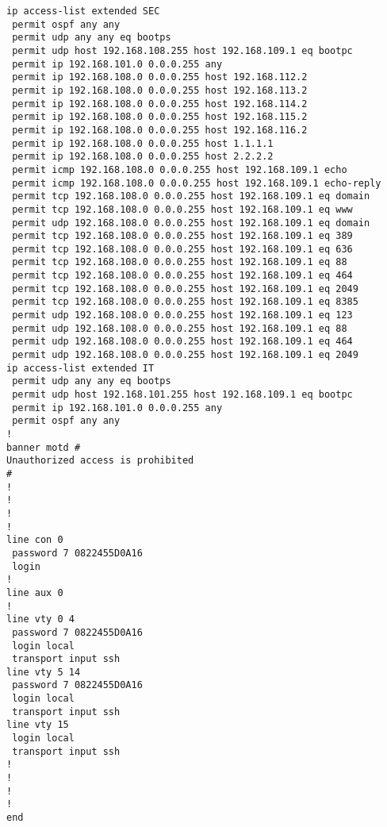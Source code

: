 \documentclass[14pt, a4paper]{extarticle}
\begin{document}
\begin{appendices}
\begin{lstlisting}[caption=Конфигурация устройства SW\_2\_L3\_IVANOV\label{list:conf_sw2_l3}]
ip access-list extended SEC
 permit ospf any any
 permit udp any any eq bootps
 permit udp host 192.168.108.255 host 192.168.109.1 eq bootpc
 permit ip 192.168.101.0 0.0.0.255 any
 permit ip 192.168.108.0 0.0.0.255 host 192.168.112.2
 permit ip 192.168.108.0 0.0.0.255 host 192.168.113.2
 permit ip 192.168.108.0 0.0.0.255 host 192.168.114.2
 permit ip 192.168.108.0 0.0.0.255 host 192.168.115.2
 permit ip 192.168.108.0 0.0.0.255 host 192.168.116.2
 permit ip 192.168.108.0 0.0.0.255 host 1.1.1.1
 permit ip 192.168.108.0 0.0.0.255 host 2.2.2.2
 permit icmp 192.168.108.0 0.0.0.255 host 192.168.109.1 echo
 permit icmp 192.168.108.0 0.0.0.255 host 192.168.109.1 echo-reply
 permit tcp 192.168.108.0 0.0.0.255 host 192.168.109.1 eq domain
 permit tcp 192.168.108.0 0.0.0.255 host 192.168.109.1 eq www
 permit udp 192.168.108.0 0.0.0.255 host 192.168.109.1 eq domain
 permit tcp 192.168.108.0 0.0.0.255 host 192.168.109.1 eq 389
 permit tcp 192.168.108.0 0.0.0.255 host 192.168.109.1 eq 636
 permit tcp 192.168.108.0 0.0.0.255 host 192.168.109.1 eq 88
 permit tcp 192.168.108.0 0.0.0.255 host 192.168.109.1 eq 464
 permit tcp 192.168.108.0 0.0.0.255 host 192.168.109.1 eq 2049
 permit tcp 192.168.108.0 0.0.0.255 host 192.168.109.1 eq 8385
 permit udp 192.168.108.0 0.0.0.255 host 192.168.109.1 eq 123
 permit udp 192.168.108.0 0.0.0.255 host 192.168.109.1 eq 88
 permit udp 192.168.108.0 0.0.0.255 host 192.168.109.1 eq 464
 permit udp 192.168.108.0 0.0.0.255 host 192.168.109.1 eq 2049
ip access-list extended IT
 permit udp any any eq bootps
 permit udp host 192.168.101.255 host 192.168.109.1 eq bootpc
 permit ip 192.168.101.0 0.0.0.255 any
 permit ospf any any
!
banner motd #
Unauthorized access is prohibited
#
!
!
!
!
line con 0
 password 7 0822455D0A16
 login
!
line aux 0
!
line vty 0 4
 password 7 0822455D0A16
 login local
 transport input ssh
line vty 5 14
 password 7 0822455D0A16
 login local
 transport input ssh
line vty 15
 login local
 transport input ssh
!
!
!
!
end

\end{lstlisting}


\end{appendices}
\end{document}
